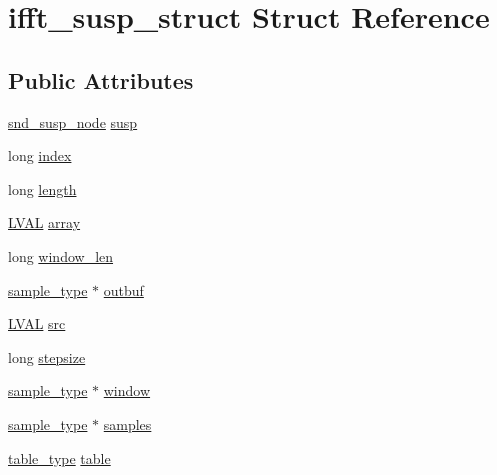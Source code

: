 \hypertarget{structifft__susp__struct}{}\section{ifft\+\_\+susp\+\_\+struct Struct Reference}
\label{structifft__susp__struct}
\subsection*{Public Attributes}
\begin{DoxyCompactItemize}
\item 
\hyperlink{sound_8h_a6b268203688a934bd798ceb55f85d4c0}{snd\+\_\+susp\+\_\+node} \hyperlink{structifft__susp__struct_acb486f015843ecec7aa5411020613389}{susp}
\item 
long \hyperlink{structifft__susp__struct_ae493e253e96a715cb894162fd1f2b6c8}{index}
\item 
long \hyperlink{structifft__susp__struct_acb433849910b0830727500dc06ca3915}{length}
\item 
\hyperlink{xldmem_8h_a9a9ec6a5fbca2b40ed8d19faa799be8c}{L\+V\+AL} \hyperlink{structifft__susp__struct_a8203862bee427676ae42505e4d612dff}{array}
\item 
long \hyperlink{structifft__susp__struct_adabf8f5013bd23e2c56f58ca9f6f74db}{window\+\_\+len}
\item 
\hyperlink{sound_8h_a3a9d1d4a1c153390d2401a6e9f71b32c}{sample\+\_\+type} $\ast$ \hyperlink{structifft__susp__struct_a07bbbb0b4c0a60c16ca5bc6b361dfa44}{outbuf}
\item 
\hyperlink{xldmem_8h_a9a9ec6a5fbca2b40ed8d19faa799be8c}{L\+V\+AL} \hyperlink{structifft__susp__struct_a7316d45d90f48ac54adc5081898a1f30}{src}
\item 
long \hyperlink{structifft__susp__struct_a52eb060b33b57c86c0ee78928d677348}{stepsize}
\item 
\hyperlink{sound_8h_a3a9d1d4a1c153390d2401a6e9f71b32c}{sample\+\_\+type} $\ast$ \hyperlink{structifft__susp__struct_a4af17d557b4dc005cffa1645bd4b3d4b}{window}
\item 
\hyperlink{sound_8h_a3a9d1d4a1c153390d2401a6e9f71b32c}{sample\+\_\+type} $\ast$ \hyperlink{structifft__susp__struct_aebaddc62d15c0840ef1872e62e2dacf1}{samples}
\item 
\hyperlink{sound_8h_a187b856587310160cfd8b383e7377171}{table\+\_\+type} \hyperlink{structifft__susp__struct_a03649ba177969d6ae7ada6ccee9e583d}{table}
\end{DoxyCompactItemize}


